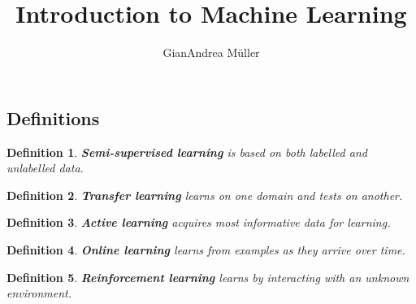 \documentclass[10pt,a4paper]{scrartcl}
\title{Introduction to Machine Learning}
\author{GianAndrea Müller}
\newtheorem{define}{Definition}
\begin{document}
\begin{multicols*}{4}
\maketitle
\tableofcontents
\end{multicols*}

\begin{multicols*}{2}
\section{Definitions}

\begin{define}
\textbf{Semi-supervised learning} is based on both labelled and unlabelled data.
\end{define}

\begin{define}
\textbf{Transfer learning} learns on one domain and tests on another.
\end{define}

\begin{define}
\textbf{Active learning} acquires most informative data for learning.
\end{define}

\begin{define}
\textbf{Online learning} learns from examples as they arrive over time.
\end{define}

\begin{define}
\textbf{Reinforcement learning} learns by interacting with an unknown environment.
\end{define}


\end{multicols*}
\end{document}
